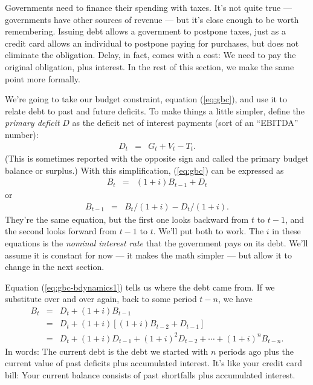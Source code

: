 Governments need to finance their spending with taxes.
It's not quite true --- governments have other sources of revenue --- but it's close enough to be worth remembering.
Issuing debt allows a government to postpone taxes,
just as a credit card allows an individual to postpone paying
for purchases,
but does not eliminate the obligation.
Delay, in fact, comes with a cost:  We need to pay the original
obligation, plus interest.
In the rest of this section, we make the same point more formally.

We're going to take our budget constraint, equation (\ref{eq:gbc}),
and use it to relate debt to past and future deficits.
To make things a little simpler,
define the {\it primary deficit\/} $D$ as the deficit
net of interest payments (sort of an ``EBITDA'' number):
\begin{eqnarray*}
    D_t &=&  G_t + V_t - T_t .
\end{eqnarray*}
(This is sometimes reported with the opposite
sign and called the primary budget balance or surplus.)
With this simplification, (\ref{eq:gbc}) can be expressed as
\begin{eqnarray}
    B_{t}   &=& (1+i) B_{t-1} + D_t
   \label{eq:gbc-bdynamics1}
\end{eqnarray}
or
\begin{eqnarray}
    B_{t-1}  &=&  B_{t}/(1+i) - D_t/(1+i) .
    \label{eq:gbc-bdynamics2}
\end{eqnarray}
They're the same equation, but the first one looks backward from $t$ to $t-1$,
and the second looks forward from $t-1$ to $t$.
We'll put both to work.
The $i$ in these equations is the \textit{nominal interest rate} that the government pays on its debt.
We'll assume it is constant for now --- it makes the math simpler ---
but allow it to change in the next section.

Equation (\ref{eq:gbc-bdynamics1}) tells us where the debt came from.
If we substitute over and over again, back to some period $t-n$,
we have
\begin{eqnarray*}
    B_{t}  &=& D_t + (1+i) B_{t-1} \\
            &=& D_t + (1+i) [(1+i) B_{t-2} + D_{t-1}] \\
            &=& D_t + (1+i) D_{t-1} + (1+i)^2 D_{t-2} + \cdots + (1+i)^n B_{t-n}.
\end{eqnarray*}
In words:  The current debt is the debt we started with $n$ periods ago
plus the current value of past deficits plus accumulated interest.
It's like your credit card bill: Your current balance consists of past shortfalls plus accumulated interest.


